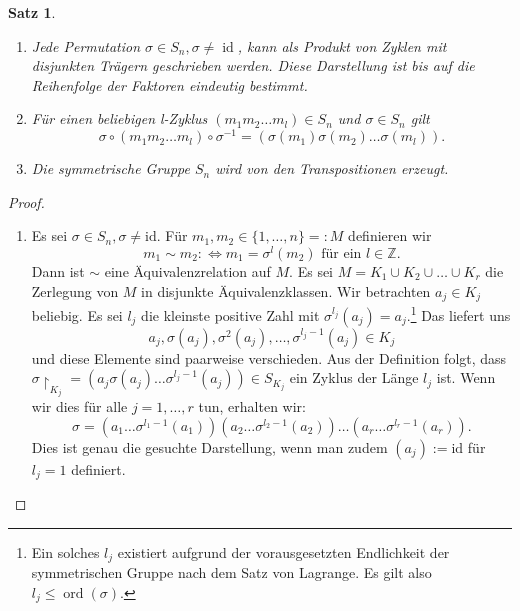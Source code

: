 \documentclass[12pt]{scrartcl} %
\DeclareMathOperator{\id}{id}
\DeclareMathOperator{\ord}{ord}
\newtheorem{thm}{Satz}[section]
\theoremstyle{definition}
\theoremstyle{remark}
\begin{document}
\begin{thm}
\begin{enumerate}[label=(\alph*)]
	\item Jede Permutation $\sigma\in S_n, \sigma\neq \id$, kann als Produkt von Zyklen mit disjunkten Trägern geschrieben werden.
		Diese Darstellung ist bis auf die Reihenfolge der Faktoren eindeutig bestimmt.
	\item Für einen beliebigen l-Zyklus $(m_1m_2\dots m_l)\in S_n$ und $\sigma\in S_n$ gilt
		\[\sigma\circ(m_1m_2\dots m_l)\circ\sigma^{-1} = (\sigma(m_1)\sigma(m_2)\dots\sigma(m_l)).\]
	\item Die symmetrische Gruppe $S_n$ wird von den Transpositionen erzeugt.
\end{enumerate}
\end{thm}

\begin{proof}
	\begin{enumerate}[label=(\alph*)]
	\item Es sei $\sigma\in S_n, \sigma\neq\text{id}$. Für $m_1,m_2\in\{1,\dots,n\}=:M$ definieren wir 
		\[m_1\sim m_2 :\Leftrightarrow \text{\(m_1 = \sigma^l(m_2)\) für ein \(l\in\mathbb{Z}\)}.\]
		Dann ist $\sim$ eine Äquivalenzrelation auf $M$.
		Es sei $M = K_1\cup K_2\cup\dots\cup K_r$ die Zerlegung von $M$ in disjunkte Äquivalenzklassen.
		Wir betrachten $a_j\in K_j$ beliebig.
		Es sei $l_j$ die kleinste positive Zahl mit $\sigma^{l_j}(a_j) = a_j$.\footnote{Ein solches $l_j$ existiert aufgrund der vorausgesetzten Endlichkeit der symmetrischen Gruppe nach dem Satz von Lagrange. Es gilt also $l_j \leq \ord(\sigma)$.} %
		Das liefert uns \[a_j,\sigma(a_j),\sigma^2(a_j),\dots,\sigma^{l_j-1}(a_j)\in K_j\] und diese Elemente sind paarweise verschieden. 
		Aus der Definition folgt, dass $\sigma\upharpoonright_{K_j}=(a_j\sigma(a_j)\dots\sigma^{l_j-1}(a_j))\in S_{K_j}$ ein Zyklus der Länge $l_j$ ist.
		Wenn wir dies für alle $j=1,\dots,r$ tun, erhalten wir:
		\[\sigma = (a_1\dots\sigma^{l_1-1}(a_1))(a_2\dots\sigma^{l_2-1}(a_2))\dots(a_r\dots\sigma^{l_r-1}(a_r)).\]
		Dies ist genau die gesuchte Darstellung, wenn man zudem $(a_j):=\text{id}$ für $l_j = 1$ definiert.


\end{enumerate}
\end{proof}
\end{document}
